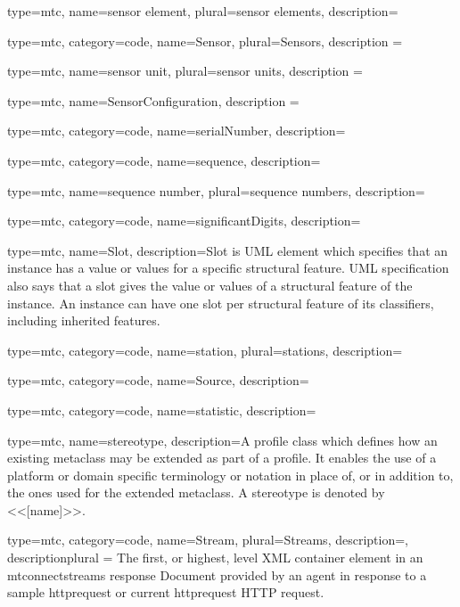 {
type=mtc,
name={sensor element},
plural={sensor elements},
description={}
}

{
  type=mtc,
  category=code,
  name={Sensor},
  plural={Sensors},
  description = {}
}

{
  type=mtc,
  name={sensor unit},
  plural={sensor units},
  description = {}
}

{
  type=mtc,
  name={SensorConfiguration},
  description = {}
}

{
  type=mtc,
  category=code,
  name={serialNumber},
  description={}
}

{
  type=mtc,
  category=code,
  name={sequence},
  description={}
}

{
  type=mtc,
  name={sequence number},
  plural={sequence numbers},
  description={}
}

{
  type=mtc,
  category=code,
  name={significantDigits},
  description={}
}

{
  type=mtc,
  name=Slot,
  description={Slot is UML element which specifies that an instance has a value or values for a specific structural feature. UML specification also says that a slot gives the value or values of a structural feature of the instance. An instance can have one slot per structural feature of its classifiers, including inherited features.}
}

{
  type=mtc,
  category=code,
  name={station},
  plural={stations},
  description={}
}

{
  type=mtc,
  category=code,
  name={Source},
  description={}
}

{
  type=mtc,
  category=code,
  name={statistic},
  description={}
}


{
  type=mtc,
  name=stereotype,
  description={A profile class which defines how an existing metaclass may be extended as part of a profile. It enables the use of a platform or domain specific terminology or notation in place of, or in addition to, the ones used for the extended metaclass. A stereotype is denoted by <<[name]>>.}
}

{
  type=mtc,
  category=code,
  name={Stream},
  plural={Streams},
  description={},
  descriptionplural = {The first, or highest, level XML container element in an \glspl{mtconnectstream} \gls{response} Document provided by an \gls{agent} in response to a \gls{sample httprequest} or \gls{current httprequest} HTTP \gls{request}.}
}

